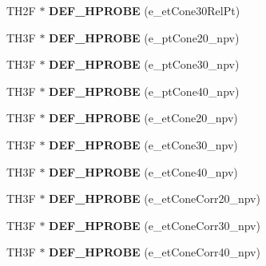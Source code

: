 \begin{DoxyCompactItemize}
\item 
\hypertarget{classHistos__Fake_aa999c7f99251bebb3847ce5d581b0c4c}{
TH2F $\ast$ {\bfseries DEF\_\-HPROBE} (e\_\-etCone30RelPt)}
\label{classHistos__Fake_aa999c7f99251bebb3847ce5d581b0c4c}

\item 
\hypertarget{classHistos__Fake_a18e29bdac868eadb43f74f4745e4588f}{
TH3F $\ast$ {\bfseries DEF\_\-HPROBE} (e\_\-ptCone20\_\-npv)}
\label{classHistos__Fake_a18e29bdac868eadb43f74f4745e4588f}

\item 
\hypertarget{classHistos__Fake_abf54eeadfe8c6c2c357adc7105c16bd4}{
TH3F $\ast$ {\bfseries DEF\_\-HPROBE} (e\_\-ptCone30\_\-npv)}
\label{classHistos__Fake_abf54eeadfe8c6c2c357adc7105c16bd4}

\item 
\hypertarget{classHistos__Fake_abc3e2d3ab2a5242193476bbf2f23da94}{
TH3F $\ast$ {\bfseries DEF\_\-HPROBE} (e\_\-ptCone40\_\-npv)}
\label{classHistos__Fake_abc3e2d3ab2a5242193476bbf2f23da94}

\item 
\hypertarget{classHistos__Fake_ad0807776f52274c456bd2fca33f37849}{
TH3F $\ast$ {\bfseries DEF\_\-HPROBE} (e\_\-etCone20\_\-npv)}
\label{classHistos__Fake_ad0807776f52274c456bd2fca33f37849}

\item 
\hypertarget{classHistos__Fake_a1d4b1adaf39df507f4bd0e81ee315a77}{
TH3F $\ast$ {\bfseries DEF\_\-HPROBE} (e\_\-etCone30\_\-npv)}
\label{classHistos__Fake_a1d4b1adaf39df507f4bd0e81ee315a77}

\item 
\hypertarget{classHistos__Fake_ab7e4f70fc5df70e05a6bfbc29c6c6988}{
TH3F $\ast$ {\bfseries DEF\_\-HPROBE} (e\_\-etCone40\_\-npv)}
\label{classHistos__Fake_ab7e4f70fc5df70e05a6bfbc29c6c6988}

\item 
\hypertarget{classHistos__Fake_ad02106cdf0930426dfd6b5b467fe333b}{
TH3F $\ast$ {\bfseries DEF\_\-HPROBE} (e\_\-etConeCorr20\_\-npv)}
\label{classHistos__Fake_ad02106cdf0930426dfd6b5b467fe333b}

\item 
\hypertarget{classHistos__Fake_a355edb37a98e38c6804b02f5b17c5a04}{
TH3F $\ast$ {\bfseries DEF\_\-HPROBE} (e\_\-etConeCorr30\_\-npv)}
\label{classHistos__Fake_a355edb37a98e38c6804b02f5b17c5a04}

\item 
\hypertarget{classHistos__Fake_aa7d0e46d21769e37e3a10f4c5fe97337}{
TH3F $\ast$ {\bfseries DEF\_\-HPROBE} (e\_\-etConeCorr40\_\-npv)}
\label{classHistos__Fake_aa7d0e46d21769e37e3a10f4c5fe97337}


\end{DoxyCompactItemize}
